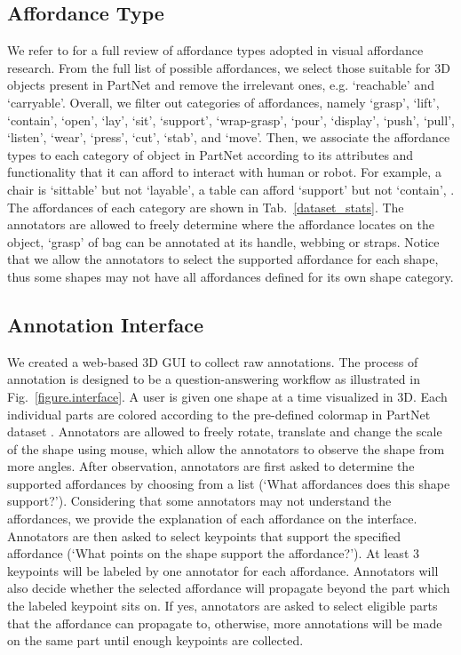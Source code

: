 \documentclass[final]{cvpr}
\begin{document}
 

\subsection{Affordance Type}
We refer to \cite{hassanin2018visual} for a full review of affordance types adopted in visual affordance research. From the full list of possible affordances, we select those suitable for 3D objects present in PartNet \cite{mo2019partnet} and remove the irrelevant ones, e.g. `reachable' and `carryable'. Overall, we filter out  categories of affordances, namely `grasp', `lift', `contain', `open', `lay', `sit', `support', `wrap-grasp', `pour', `display', `push', `pull', `listen', `wear', `press', `cut', `stab', and `move'. Then, we associate the affordance types to each category of object in PartNet according to its attributes and functionality that it can afford to interact with human or robot. For example, a chair is `sittable' but not `layable', a table can afford `support' but not `contain', \etc. The affordances of each category are shown in Tab.~\ref{dataset_stats}. The annotators are allowed to freely determine where the affordance locates on the object, \eg `grasp' of bag can be annotated at its handle, webbing or straps. Notice that we allow the annotators to select the supported affordance for each shape, thus some shapes may not have all affordances defined for its own shape category. 





\subsection{Annotation Interface}

We created a web-based 3D GUI to collect raw annotations. The process of annotation is designed to be a question-answering workflow as illustrated in Fig.~\ref{figure.interface}. A user is given one shape at a time visualized in 3D. Each individual parts are colored according to the pre-defined colormap in PartNet dataset \cite{mo2019partnet}. Annotators are allowed to freely rotate, translate and change the scale of the shape
using mouse, which allow the annotators to observe the shape from more angles. After observation, annotators are first asked to determine the supported affordances by choosing from a list (`What affordances does this shape support?'). Considering that some
annotators may not understand the affordances, we provide the explanation of
each affordance on the interface. Annotators are then asked to select keypoints that support the specified affordance (`What points on the shape support the affordance?'). At least 3 keypoints will be labeled by one annotator for each affordance. Annotators will also decide whether the selected affordance will propagate beyond the part which the labeled keypoint sits on. If yes, annotators are asked to select eligible parts that the affordance can propagate to, otherwise, more annotations will be made on the same part until enough keypoints are collected.
\end{document}
